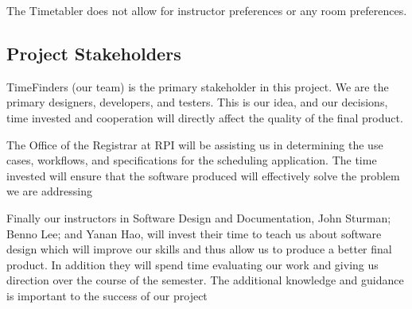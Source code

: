 \documentclass[11pt]{article}
\begin{document}
The Timetabler does not allow for instructor preferences or any room preferences.




\subsection{Project Stakeholders} %

TimeFinders (our team) is the primary stakeholder in this project.  We are the primary designers, developers, and testers.  This is our idea, and our decisions, time invested and cooperation will directly affect the quality of the final product.

The Office of the Registrar at RPI will be assisting us in determining the use cases, workflows, and specifications for the scheduling application.  The time invested will ensure that the software produced will effectively solve the problem we are addressing

Finally our instructors in Software Design and Documentation, John Sturman; Benno Lee; and Yanan Hao, will invest their time to teach us about software design which will improve our skills and thus allow us to produce a better final product.  In addition they will spend time evaluating our work and giving us direction over the course of the semester.  The additional knowledge and guidance is important to the success of our project


\end{document}
